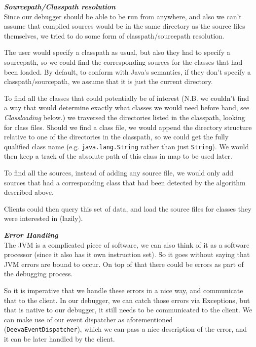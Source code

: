 \documentclass[11pt, a4paper]{article}
\begin{document}
\textbf{\emph{Sourcepath/Classpath resolution}}\\
Since our debugger should be able to be run from anywhere, and also we can't assume that compiled sources would be in the same directory as the source files themselves, we tried to do some form of classpath/sourcepath resolution.

The user would specify a classpath as usual, but also they had to specify a sourcepath, so we could find the corresponding sources for the classes that had been loaded.
By default, to conform with Java's semantics, if they don't specify a classpath/sourcepath, we assume that it is just the current directory.

To find all the classes that could potentially be of interest (N.B. we couldn't find a way that would  determine exactly what classes we would need before hand, see \emph{Classloading} below.) we traversed the directories listed in the classpath, looking for class files.
Should we find a class file, we would append the directory structure relative to one of the directories in the classpath, so we could get the fully qualified class name (e.g. \texttt{java.lang.String} rather than just \texttt{String}).
We would then keep a track of the absolute path of this class in map to be used later.

To find all the sources, instead of adding any source file, we would only add sources that had a corresponding class that had been detected by the algorithm described above.

Clients could then query this set of data, and load the source files for classes they were interested in (lazily).

\textbf{\emph{Error Handling}}\\
The JVM is a complicated piece of software, we can also think of it as a software processor (since it also has it own instruction set).
So it goes without saying that JVM errors are bound to occur.
On top of that there could be errors as part of the debugging process.

So it is imperative that we handle these errors in a nice way, and communicate that to the client.
In our debugger, we can catch those errors via Exceptions, but that is native to our debugger, it still needs to be communicated to the client.
We can make use of our event dispatcher as aforementioned (\texttt{DeevaEventDispatcher}), which we can pass a nice description of the error, and it can be later handled by the client.
\end{document}
